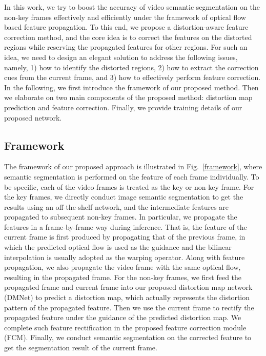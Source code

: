 \documentclass[journal]{IEEEtran}
\begin{document}
In this work, we try to boost the accuracy of video semantic segmentation on the non-key frames effectively and efficiently under the framework of optical flow based feature propagation. To this end, we propose a distortion-aware feature correction method, and the core idea is to correct the features on the distorted regions while reserving the propagated features for other regions.  For such an idea, we need to design an elegant solution to address the following issues, namely, 1) how to identify the distorted regions, 2) how to extract the correction cues from the current frame, and 3) how to effectively perform feature correction. 
In the following, we first introduce the framework of our proposed method. Then we elaborate on two main components of the proposed method: distortion map prediction and feature correction. Finally, we provide training details of our proposed network. 

\subsection{Framework}

The framework of our proposed approach is illustrated in Fig.~\ref{framework}, where semantic segmentation is performed on the feature of each frame individually.
To be specific, each of the video frames is treated as the key or non-key frame. For the key frames, we directly conduct image semantic segmentation to get the results using an off-the-shelf network, and the intermediate features are propagated to subsequent non-key frames. In particular, we propagate the features in a frame-by-frame way during inference. That is, the feature of the current frame is first produced by propagating that of the previous frame, in which the predicted optical flow is used as the guidance and the bilinear interpolation is usually adopted as the warping operator. Along with feature propagation, we also propagate the video frame with the same optical flow, resulting in the propagated frame. For the non-key frames, we first feed the propagated frame and current frame into our proposed distortion map network (DMNet) to predict a distortion map, which actually represents the distortion pattern of the propagated feature. Then we use the current frame to rectify the propagated feature under the guidance of the predicted distortion map. We complete such feature rectification in the proposed feature correction module (FCM). Finally, we conduct semantic segmentation on the corrected feature to get the segmentation result of the current frame.
\end{document}
